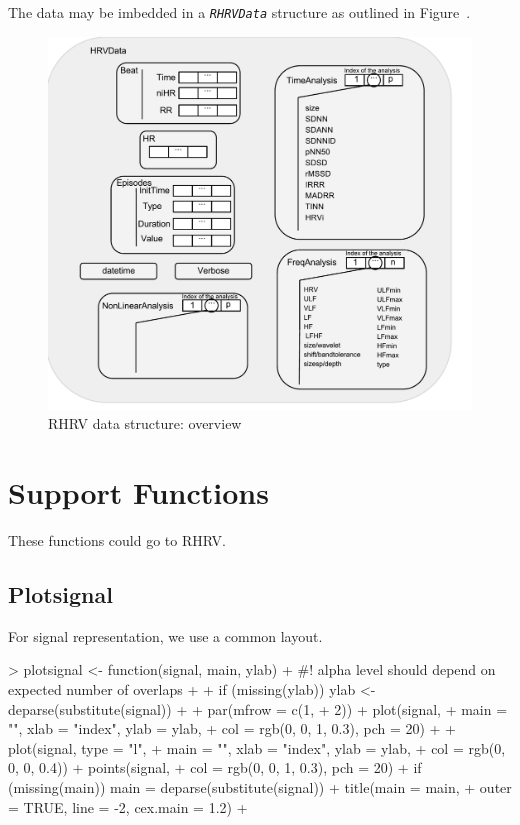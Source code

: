 \documentclass[a4paper, english, utf8]{amsart}
\newcommand{\figref}[1]{Figure\ \Vref{#1}}
\newcommand\code[1]{\textsl{\texttt{#1}}}
\begin{document}
The data may be imbedded in a \code{RHRVData} structure as outlined in \figref{fig:completeHRVData}.


\begin{figure}[htbp]
\begin{center}
\includegraphics[width=0.8\linewidth]{../media/completeHRVData}
\caption{RHRV data structure: overview}
\label{fig:completeHRVData}
\end{center}
\end{figure}


\section{Support Functions}

These functions could go to RHRV.

\subsection{Plotsignal}
For signal representation, we use a common layout.
\begin{Schunk}
\begin{Sinput}
> plotsignal <- function(signal, main, ylab) {
+ 	#! alpha level should depend on expected number of overlaps
+ 	
+ 	if (missing(ylab)) { ylab <- deparse(substitute(signal)) }
+ 
+ 	par(mfrow = c(1, 
+ 		2))
+ 	plot(signal, 
+ 		main = "", xlab = "index",  ylab = ylab,
+ 		col = rgb(0, 0, 1, 0.3), pch = 20)
+ 
+ 	plot(signal, type = "l", 
+ 		main = "",  xlab = "index", ylab = ylab,
+ 		col = rgb(0, 0, 0, 0.4))
+ 	points(signal, 
+ 		col = rgb(0, 0, 1, 0.3), pch = 20)
+ 	if (missing(main)) { main = deparse(substitute(signal)) }
+ 	title(main = main, 
+ 		outer = TRUE, line = -2, cex.main = 1.2)
+ }
\end{Sinput}
\end{Schunk}
\end{document}
